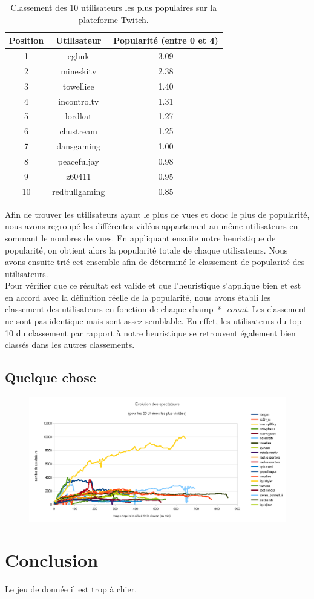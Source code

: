 \documentclass[11pt, a4paper, titlepage]{scrartcl}
\begin{document}
\begin{table}[h]
  \centering
   \caption{\label{tab:user_rank} Classement des 10 utilisateurs les plus populaires
   sur la plateforme Twitch.}
   \begin{tabular}{|c|c|c|}
     \hline
     Position & Utilisateur & Popularité (entre 0 et 4) \\
     \hline
      1 & eghuk & 3.09 \\
      2 & mineskitv & 2.38 \\
      3 & towelliee & 1.40 \\
      4 & incontroltv & 1.31 \\
      5 & lordkat & 1.27 \\
      6 & chustream & 1.25 \\
      7 & dansgaming & 1.00 \\
      8 & peacefuljay & 0.98 \\
      9 & z60411 & 0.95 \\
      10 & redbullgaming & 0.85 \\
     \hline
  \end{tabular}
\end{table}

Afin de trouver les utilisateurs ayant le plus de vues et donc le plus de
popularité, nous avons regroupé les différentes vidéos appartenant au même
utilisateurs en sommant le nombres de vues. En appliquant ensuite notre
heuristique de popularité, on obtient alors la popularité totale de chaque
utilisateurs. Nous avons ensuite trié cet ensemble afin de déterminé le
classement de popularité des utilisateurs. \\

Pour vérifier que ce résultat est valide et que l'heuristique s'applique bien
et est en accord avec la définition réelle de la popularité, nous avons établi
les classement des utilisateurs en fonction de chaque champ \textit{*\_count}.
Les classement ne sont pas identique mais sont assez semblable. En effet, les
utilisateurs du top 10 du classement par rapport à notre heuristique se
retrouvent également bien classés dans les autres classements. \\

\subsection{Quelque chose}
\begin{figure}[h]
    \centering
    \includegraphics[width=\textwidth]{images/top_20_view_evolutions}
    \caption{}
\end{figure}

\section{Conclusion}

Le jeu de donnée il est trop à chier.
\end{document}
